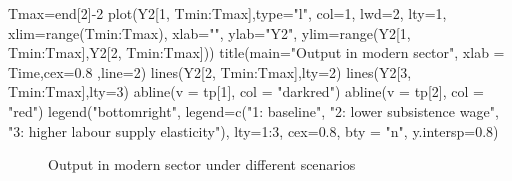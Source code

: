 \documentclass[
  letterpaper,
  DIV=11,
  numbers=noendperiod]{scrreprt}
\newenvironment{Shaded}{\begin{snugshade}}{\end{snugshade}}
\newcommand{\AttributeTok}[1]{\textcolor[rgb]{0.40,0.45,0.13}{#1}}
\newcommand{\DecValTok}[1]{\textcolor[rgb]{0.68,0.00,0.00}{#1}}
\newcommand{\FloatTok}[1]{\textcolor[rgb]{0.68,0.00,0.00}{#1}}
\newcommand{\FunctionTok}[1]{\textcolor[rgb]{0.28,0.35,0.67}{#1}}
\newcommand{\NormalTok}[1]{\textcolor[rgb]{0.00,0.23,0.31}{#1}}
\newcommand{\OtherTok}[1]{\textcolor[rgb]{0.00,0.23,0.31}{#1}}
\newcommand{\SpecialCharTok}[1]{\textcolor[rgb]{0.37,0.37,0.37}{#1}}
\newcommand{\StringTok}[1]{\textcolor[rgb]{0.13,0.47,0.30}{#1}}
\begin{document}
\begin{Shaded}
\begin{Highlighting}[]
\NormalTok{Tmax}\OtherTok{=}\NormalTok{end[}\DecValTok{2}\NormalTok{]}\SpecialCharTok{{-}}\DecValTok{2}
\FunctionTok{plot}\NormalTok{(Y2[}\DecValTok{1}\NormalTok{, Tmin}\SpecialCharTok{:}\NormalTok{Tmax],}\AttributeTok{type=}\StringTok{"l"}\NormalTok{, }\AttributeTok{col=}\DecValTok{1}\NormalTok{, }\AttributeTok{lwd=}\DecValTok{2}\NormalTok{, }\AttributeTok{lty=}\DecValTok{1}\NormalTok{, }\AttributeTok{xlim=}\FunctionTok{range}\NormalTok{(Tmin}\SpecialCharTok{:}\NormalTok{Tmax), }\AttributeTok{xlab=}\StringTok{""}\NormalTok{, }\AttributeTok{ylab=}\StringTok{"Y2"}\NormalTok{, }\AttributeTok{ylim=}\FunctionTok{range}\NormalTok{(Y2[}\DecValTok{1}\NormalTok{, Tmin}\SpecialCharTok{:}\NormalTok{Tmax],Y2[}\DecValTok{2}\NormalTok{, Tmin}\SpecialCharTok{:}\NormalTok{Tmax])) }
\FunctionTok{title}\NormalTok{(}\AttributeTok{main=}\StringTok{"Output in  modern sector"}\NormalTok{, }\AttributeTok{xlab =} \StringTok{\textquotesingle{}Time\textquotesingle{}}\NormalTok{,}\AttributeTok{cex=}\FloatTok{0.8}\NormalTok{ ,}\AttributeTok{line=}\DecValTok{2}\NormalTok{)}
\FunctionTok{lines}\NormalTok{(Y2[}\DecValTok{2}\NormalTok{, Tmin}\SpecialCharTok{:}\NormalTok{Tmax],}\AttributeTok{lty=}\DecValTok{2}\NormalTok{)}
\FunctionTok{lines}\NormalTok{(Y2[}\DecValTok{3}\NormalTok{, Tmin}\SpecialCharTok{:}\NormalTok{Tmax],}\AttributeTok{lty=}\DecValTok{3}\NormalTok{)}
\FunctionTok{abline}\NormalTok{(}\AttributeTok{v =}\NormalTok{ tp[}\DecValTok{1}\NormalTok{], }\AttributeTok{col =} \StringTok{"darkred"}\NormalTok{)}
\FunctionTok{abline}\NormalTok{(}\AttributeTok{v =}\NormalTok{ tp[}\DecValTok{2}\NormalTok{], }\AttributeTok{col =} \StringTok{"red"}\NormalTok{)}
\FunctionTok{legend}\NormalTok{(}\StringTok{"bottomright"}\NormalTok{, }\AttributeTok{legend=}\FunctionTok{c}\NormalTok{(}\StringTok{"1: baseline"}\NormalTok{, }\StringTok{"2: lower subsistence wage"}\NormalTok{, }\StringTok{"3: higher labour supply elasticity"}\NormalTok{),}
       \AttributeTok{lty=}\DecValTok{1}\SpecialCharTok{:}\DecValTok{3}\NormalTok{, }\AttributeTok{cex=}\FloatTok{0.8}\NormalTok{, }\AttributeTok{bty =} \StringTok{"n"}\NormalTok{, }\AttributeTok{y.intersp=}\FloatTok{0.8}\NormalTok{)}
\end{Highlighting}
\end{Shaded}

\begin{figure}[H]


\caption{\label{fig-scen2}Output in modern sector under different
scenarios}

\end{figure}%
\end{document}

